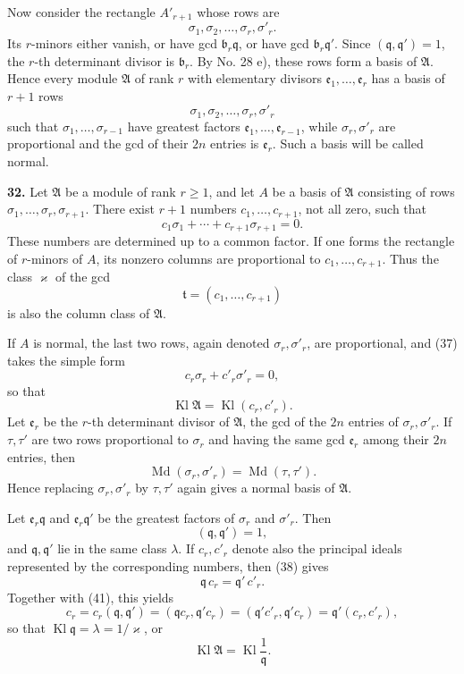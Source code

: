 \documentclass[11pt,a4paper]{article}
\newcommand{\Kl}{\operatorname{Kl}}
\begin{document}
Now consider the rectangle \(A'_{r+1}\) whose rows are
\[
 \sigma_1,\sigma_2,\ldots,\sigma_r,\sigma'_r .
\]
Its \(r\)-minors either vanish, or have gcd \(\mathfrak b_r\mathfrak q\), or have gcd \(\mathfrak b_r\mathfrak q'\). Since \((\mathfrak q,\mathfrak q')=1\), the \(r\)-th determinant divisor is \(\mathfrak b_r\). By No. 28 e), these rows form a basis of \(\mathfrak A\). Hence every module \(\mathfrak A\) of rank \(r\) with elementary divisors \(\mathfrak e_1,\ldots,\mathfrak e_r\) has a basis of \(r+1\) rows
\[
 \sigma_1,\sigma_2,\ldots,\sigma_r,\sigma'_r
\]
such that \(\sigma_1,\ldots,\sigma_{r-1}\) have greatest factors \(\mathfrak e_1,\ldots,\mathfrak e_{r-1}\), while \(\sigma_r,\sigma'_r\) are proportional and the gcd of their \(2n\) entries is \(\mathfrak e_r\). Such a basis will be called normal.

\textbf{32.} Let \(\mathfrak A\) be a module of rank \(r\ge1\), and let \(A\) be a basis of \(\mathfrak A\) consisting of rows \(\sigma_1,\ldots,\sigma_r,\sigma_{r+1}\). There exist \(r+1\) numbers \(c_1,\ldots,c_{r+1}\), not all zero, such that
\[
 c_1\sigma_1+\cdots+c_{r+1}\sigma_{r+1}=0. \tag{37}
\]
These numbers are determined up to a common factor. If one forms the rectangle of \(r\)-minors of \(A\), its nonzero columns are proportional to \(c_1,\ldots,c_{r+1}\). Thus the class \(\varkappa\) of the gcd
\[
 \mathfrak t=(c_1,\ldots,c_{r+1})
\]
is also the column class of \(\mathfrak A\).

If \(A\) is normal, the last two rows, again denoted \(\sigma_r,\sigma'_r\), are proportional, and (37) takes the simple form
\[
 c_r\sigma_r+c'_r\sigma'_r=0, \tag{38}
\]
so that
\[
 \Kl\mathfrak A=\Kl(c_r,c'_r). \tag{39}
\]
Let \(\mathfrak e_r\) be the \(r\)-th determinant divisor of \(\mathfrak A\), the gcd of the \(2n\) entries of \(\sigma_r,\sigma'_r\). If \(\tau,\tau'\) are two rows proportional to \(\sigma_r\) and having the same gcd \(\mathfrak e_r\) among their \(2n\) entries, then
\[
 \operatorname{Md}(\sigma_r,\sigma'_r)=\operatorname{Md}(\tau,\tau'). \tag{40}
\]
Hence replacing \(\sigma_r,\sigma'_r\) by \(\tau,\tau'\) again gives a normal basis of \(\mathfrak A\).

Let \(\mathfrak e_r\mathfrak q\) and \(\mathfrak e_r\mathfrak q'\) be the greatest factors of \(\sigma_r\) and \(\sigma'_r\). Then
\[
 (\mathfrak q,\mathfrak q')=1, \tag{41}
\]
and \(\mathfrak q,\mathfrak q'\) lie in the same class \(\lambda\). If \(c_r,c'_r\) denote also the principal ideals represented by the corresponding numbers, then (38) gives
\[
 \mathfrak q\,c_r=\mathfrak q'\,c'_r.
\]
Together with (41), this yields
\[
 c_r=c_r(\mathfrak q,\mathfrak q')=(\mathfrak q c_r,\mathfrak q'c_r)
       =(\mathfrak q'c'_r,\mathfrak q'c_r)=\mathfrak q'(c_r,c'_r),
\]
so that \(\Kl\mathfrak q=\lambda=1/\varkappa\), or
\[
 \Kl\mathfrak A=\Kl\frac{1}{\mathfrak q}. \tag{42}
\]
\end{document}
